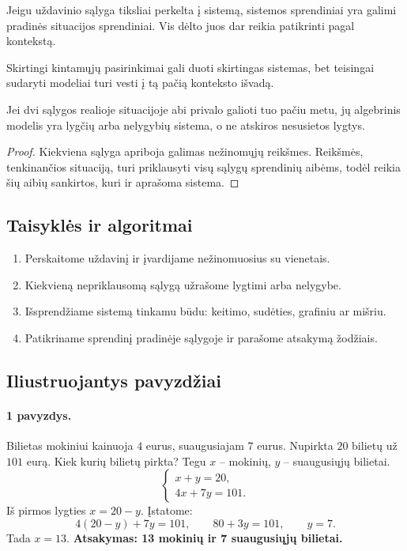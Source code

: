 \begin{savybe}
Jeigu uždavinio sąlyga tiksliai perkelta į sistemą, sistemos sprendiniai yra galimi pradinės situacijos sprendiniai. Vis dėlto juos dar reikia patikrinti pagal kontekstą.
\end{savybe}

\begin{savybe}
Skirtingi kintamųjų pasirinkimai gali duoti skirtingas sistemas, bet teisingai sudaryti modeliai turi vesti į tą pačią konteksto išvadą.
\end{savybe}

\begin{teorema}
Jei dvi sąlygos realioje situacijoje abi privalo galioti tuo pačiu metu, jų algebrinis modelis yra lygčių arba nelygybių sistema, o ne atskiros nesusietos lygtys.
\end{teorema}
\begin{proof}
Kiekviena sąlyga apriboja galimas nežinomųjų reikšmes. Reikšmės, tenkinančios situaciją, turi priklausyti visų sąlygų sprendinių aibėms, todėl reikia šių aibių sankirtos, kuri ir aprašoma sistema.
\end{proof}

\subsection{Taisyklės ir algoritmai}

\begin{enumerate}
\item Perskaitome uždavinį ir įvardijame nežinomuosius su vienetais.
\item Kiekvieną nepriklausomą sąlygą užrašome lygtimi arba nelygybe.
\item Išsprendžiame sistemą tinkamu būdu: keitimo, sudėties, grafiniu ar mišriu.
\item Patikriname sprendinį pradinėje sąlygoje ir parašome atsakymą žodžiais.
\end{enumerate}

\subsection{Iliustruojantys pavyzdžiai}

\paragraph{1 pavyzdys.}
Bilietas mokiniui kainuoja $4$ eurus, suaugusiajam $7$ eurus. Nupirkta $20$ bilietų už $101$ eurą. Kiek kurių bilietų pirkta?
Tegu $x$ -- mokinių, $y$ -- suaugusiųjų bilietai.
\[
\begin{cases}
x+y=20,\\
4x+7y=101.
\end{cases}
\]
Iš pirmos lygties $x=20-y$. Įstatome:
\[
4(20-y)+7y=101,\qquad 80+3y=101,\qquad y=7.
\]
Tada $x=13$. \textbf{Atsakymas: 13 mokinių ir 7 suaugusiųjų bilietai.}


